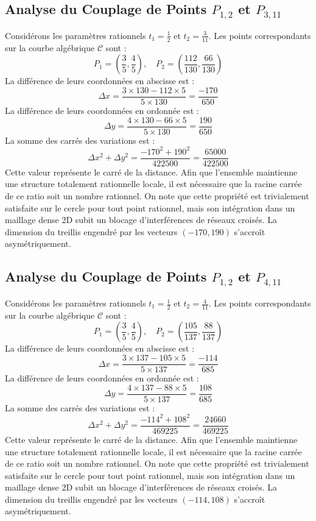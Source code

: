 \documentclass[12pt, a4paper]{article}
\begin{document}
\subsection{Analyse du Couplage de Points $P_{1,2}$ et $P_{3,11}$}
Considérons les paramètres rationnels $t_1 = \frac{1}{2}$ et $t_2 = \frac{3}{11}$.
Les points correspondants sur la courbe algébrique $\mathcal{C}$ sont :
$$ P_1 = \left( \frac{3}{5}, \frac{4}{5} \right), \quad P_2 = \left( \frac{112}{130}, \frac{66}{130} \right) $$
La différence de leurs coordonnées en abscisse est :
$$ \Delta x = \frac{3 \times 130 - 112 \times 5}{5 \times 130} = \frac{-170}{650} $$
La différence de leurs coordonnées en ordonnée est :
$$ \Delta y = \frac{4 \times 130 - 66 \times 5}{5 \times 130} = \frac{190}{650} $$
La somme des carrés des variations est :
$$ \Delta x^2 + \Delta y^2 = \frac{ -170^2 + 190^2 }{ 422500 } = \frac{ 65000 }{ 422500 } $$
Cette valeur représente le carré de la distance. Afin que l'ensemble maintienne une structure totalement rationnelle locale, il est nécessaire que la racine carrée de ce ratio soit un nombre rationnel. On note que cette propriété est trivialement satisfaite sur le cercle pour tout point rationnel, mais son intégration dans un maillage dense 2D subit un blocage d'interférences de réseaux croisés. La dimension du treillis engendré par les vecteurs $( -170, 190 )$ s'accroît asymétriquement.


\subsection{Analyse du Couplage de Points $P_{1,2}$ et $P_{4,11}$}
Considérons les paramètres rationnels $t_1 = \frac{1}{2}$ et $t_2 = \frac{4}{11}$.
Les points correspondants sur la courbe algébrique $\mathcal{C}$ sont :
$$ P_1 = \left( \frac{3}{5}, \frac{4}{5} \right), \quad P_2 = \left( \frac{105}{137}, \frac{88}{137} \right) $$
La différence de leurs coordonnées en abscisse est :
$$ \Delta x = \frac{3 \times 137 - 105 \times 5}{5 \times 137} = \frac{-114}{685} $$
La différence de leurs coordonnées en ordonnée est :
$$ \Delta y = \frac{4 \times 137 - 88 \times 5}{5 \times 137} = \frac{108}{685} $$
La somme des carrés des variations est :
$$ \Delta x^2 + \Delta y^2 = \frac{ -114^2 + 108^2 }{ 469225 } = \frac{ 24660 }{ 469225 } $$
Cette valeur représente le carré de la distance. Afin que l'ensemble maintienne une structure totalement rationnelle locale, il est nécessaire que la racine carrée de ce ratio soit un nombre rationnel. On note que cette propriété est trivialement satisfaite sur le cercle pour tout point rationnel, mais son intégration dans un maillage dense 2D subit un blocage d'interférences de réseaux croisés. La dimension du treillis engendré par les vecteurs $( -114, 108 )$ s'accroît asymétriquement.
\end{document}
